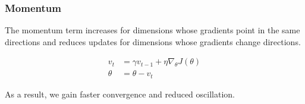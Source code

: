 \documentclass{beamer}
\begin{document}
\begin{frame}
    \frametitle{Momentum}
    
    
    The momentum term increases for dimensions whose gradients point in the same directions and reduces updates for dimensions whose gradients change directions. 
    
    \begin{equation}
        \begin{aligned} v_{t} &=\gamma v_{t-1}+\eta \nabla_{\theta} J(\theta) \\ \theta &=\theta-v_{t} \end{aligned}
    \end{equation}
    
    As a result, we gain faster convergence and reduced oscillation.
    
\end{frame}
\end{document}
